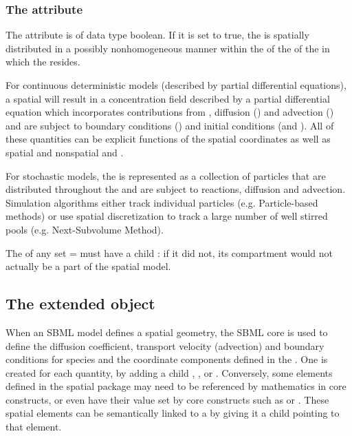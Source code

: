 \subsubsection{The \fixttspace{} attribute}
The  attribute is of data type boolean. If it is set to true, the \Species is spatially distributed in a possibly nonhomogeneous manner within the \Domains of the \DomainType of the \Compartment in which the \Species resides. 

For continuous deterministic models (described by partial differential equations), a spatial \Species will result in a concentration field described by a partial differential equation which incorporates contributions from \Reactions, diffusion (\DiffusionCoefficient) and advection (\AdvectionCoefficient) and are subject to boundary conditions (\BoundaryCondition) and initial conditions (\InitialAssignment and \Rule).  All of these quantities can be explicit functions of the spatial coordinates as well as spatial and nonspatial \Parameters and \Species.  

For stochastic models, the \Species is represented as a collection of particles that are distributed throughout the \Domains and are subject to reactions, diffusion and advection.  Simulation algorithms either track individual particles (e.g. Particle-based methods) or use spatial discretization to track a large number of well stirred pools (e.g. Next-Subvolume Method).

The  of any \Species set  =  must have a child \CompartmentMapping: if it did not, its compartment would not actually be a part of the spatial model.


\subsection{The extended \Parameter object}
\label{extended-parameter-class}
When an SBML model defines a spatial geometry, the SBML core \Parameter is used to define the diffusion coefficient, transport velocity (advection) and boundary conditions for species and the coordinate components defined in the \Geometry. One \Parameter is created for each quantity, by adding a child \DiffusionCoefficient, \AdvectionCoefficient, or \BoundaryCondition.  Conversely, some elements defined in the spatial package may need to be referenced by mathematics in core constructs, or even have their value set by core constructs such as \InitialAssignment or \Rule.  These spatial elements can be semantically linked to a \Parameter by giving it a child \SpatialSymbolReference pointing to that element.

